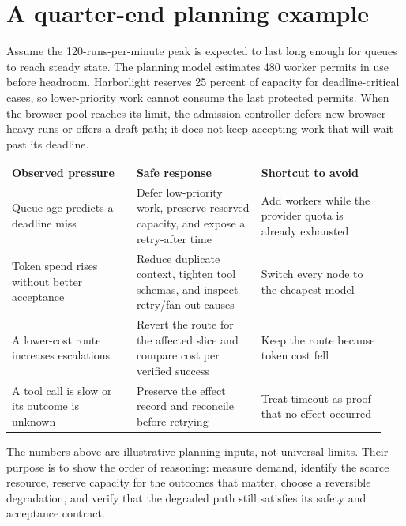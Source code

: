 \section{A quarter-end planning example}

Assume the 120-runs-per-minute peak is expected to last long enough for queues to reach steady state. The planning model estimates 480 worker permits in use before headroom. Harborlight reserves 25 percent of capacity for deadline-critical cases, so lower-priority work cannot consume the last protected permits. When the browser pool reaches its limit, the admission controller defers new browser-heavy runs or offers a draft path; it does not keep accepting work that will wait past its deadline.\par

\BookTableStart
\small
\begin{tabular}{@{}Y{0.3133\linewidth}Y{0.3133\linewidth}Y{0.3133\linewidth}@{}}
\color{white}\bfseries \textbf{Observed pressure} & \color{white}\bfseries \textbf{Safe response} & \color{white}\bfseries \textbf{Shortcut to avoid} \\
Queue age predicts a deadline miss & Defer low-priority work, preserve reserved capacity, and expose a retry-after time & Add workers while the provider quota is already exhausted \\
Token spend rises without better acceptance & Reduce duplicate context, tighten tool schemas, and inspect retry/fan-out causes & Switch every node to the cheapest model \\
A lower-cost route increases escalations & Revert the route for the affected slice and compare cost per verified success & Keep the route because token cost fell \\
A tool call is slow or its outcome is unknown & Preserve the effect record and reconcile before retrying & Treat timeout as proof that no effect occurred \\
\end{tabular}
\BookTableEnd

The numbers above are illustrative planning inputs, not universal limits. Their purpose is to show the order of reasoning: measure demand, identify the scarce resource, reserve capacity for the outcomes that matter, choose a reversible degradation, and verify that the degraded path still satisfies its safety and acceptance contract.\par

